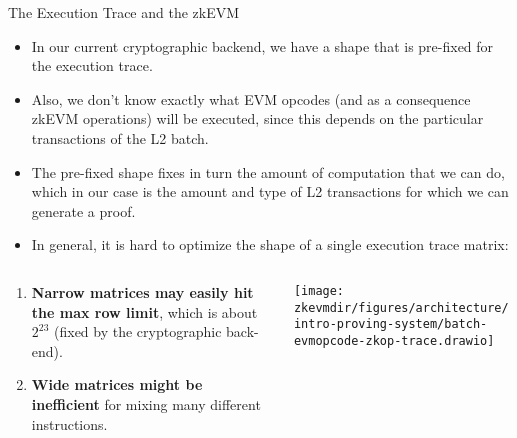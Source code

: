 \begin{frame}{The Execution Trace and the zkEVM}
\begin{itemize}
\small
\item In our current cryptographic backend, we have a shape that is pre-fixed for the execution trace.
\item Also, we don't know exactly what EVM opcodes (and as a consequence zkEVM operations) will be executed, 
since this depends on the particular transactions of the L2 batch.
\item The pre-fixed shape fixes in turn the amount of computation that we can do, which
in our case is the amount and type of L2 transactions for which we can generate a proof.
\item  In general, it is hard to optimize the shape of a single execution trace matrix:
\end{itemize}
\begin{columns}
\begin{column}{0.36\textwidth}
\begin{enumerate}
\footnotesize
\item \textbf{Narrow matrices may easily hit the max row limit}, which is about $2^{23}$
(fixed by the cryptographic back-end).
\item \textbf{Wide matrices might be inefficient} for mixing many different instructions.
\end{enumerate}
\end{column}
\begin{column}{0.55\textwidth}
\texttt{[image: \\zkevmdir/figures/architecture/intro-proving-system/batch-evmopcode-zkop-trace.drawio]}
\end{column}
\end{columns}
\end{frame}




